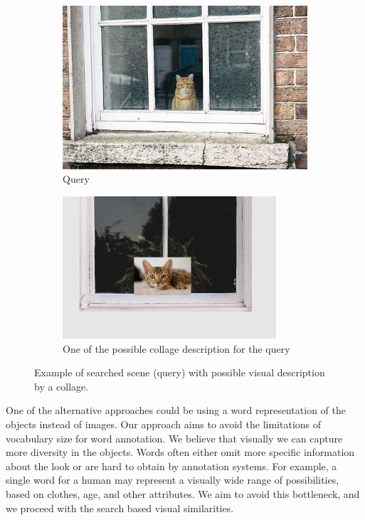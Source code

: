 \begin{figure}
\centering

\begin{subfigure}[t]{0.45\textwidth}
\includegraphics[width=0.9\linewidth]{img/cat_on_window} 
\caption{Query}
\label{fig:searched_scene}
\end{subfigure}
\begin{subfigure}[t]{0.45\textwidth}
\includegraphics[width=0.9\linewidth]{img/cat_on_window_collage}
\caption{One of the possible collage description for the query}
\label{fig:collage_example}
\end{subfigure}

\caption{Example of searched scene (query) with possible visual description by a collage.}
\label{fig:query_collage_comparison}
\end{figure}

One of the alternative approaches could be using a word representation of the objects instead of images. Our approach aims to avoid the limitations of vocabulary size for word annotation. We believe that visually we can capture more diversity in the objects. Words often either omit more specific information about the look or are hard to obtain by annotation systems. For example, a single word for a human may represent a visually wide range of possibilities, based on clothes, age, and other attributes. We aim to avoid this bottleneck, and we proceed with the search based visual similarities.

